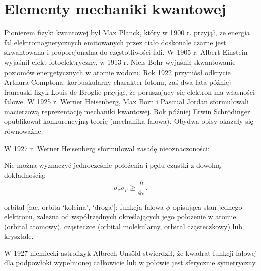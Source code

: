 \section{Elementy mechaniki kwantowej}
Pionierem fizyki kwantowej był Max Planck, który w 1900 r. przyjął, że energia fal elektromagnetycznych emitowanych przez ciało doskonale czarne jest skwantowana i proporcjonalna do częstotliwości fali.
%
%
W 1905 r. Albert Einstein wyjaśnił efekt fotoelektryczny, w 1913 r. Niels Bohr wyjaśnił skwantowanie poziomów energetycznych w atomie wodoru.
%
%
Rok 1922 przyniósł odkrycie Arthura Comptona: korpuskularny charakter fotonu, zaś dwa lata później francuski fizyk Louis de Broglie przyjął, że poruszający się elektron ma własności falowe.
%
%
W 1925 r. Werner Heisenberg, Max Born i Pascual Jordan sformułowali macierzową reprezentację mechaniki kwantowej.
%
%
%
Rok później Erwin Schrödinger opublikował konkurencyjną teorię (mechanika falowa).
Obydwa opisy okazały się równoważne.

W 1927 r. Werner Heisenberg sformułował zasadę nieoznaczoności:

\begin{theorem}
	Nie można wyznaczyć jednocześnie położenia i pędu cząstki z dowolną dokładnością:
	\begin{equation}
		\sigma_x \sigma_p \ge \frac{h}{4\pi}.
	\end{equation}
\end{theorem}

orbital [łac. orbita ‘koleina’, ‘droga’]: funkcja falowa $\phi$ opisująca stan jednego elektronu, zależna od współrzędnych określających jego położenie w atomie (orbital atomowy), cząsteczce (orbital molekularny, orbital cząsteczkowy) lub krysztale.

W 1927 niemiecki astrofizyk Albrech Unsöld stwierdził, że kwadrat funkcji falowej dla podpowłoki wypełnionej całkowicie lub w połowie jest sferycznie symetryczny.